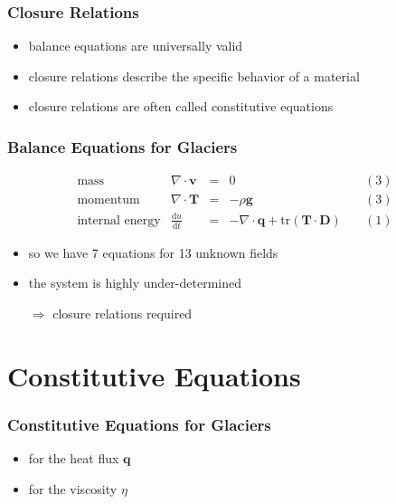 \documentclass[hide notes,intlimits]{beamer}
\begin{document}
\begin{frame}
  \frametitle{Closure Relations}
  \begin{itemize}
    \item \alert{balance equations} are universally valid
    \item \alert{closure relations} describe the specific behavior of a material
    \item \alert{closure relations} are often called \alert{constitutive equations}
  \end{itemize}
\end{frame}


\begin{frame}
  \frametitle{Balance Equations for Glaciers}
  \large{
  \begin{equation*}
  \begin{array}{lcclc}
    \text{mass} &  \nabla \cdot \mathbf{v} & = & 0 \quad & (3)\\
    \text{momentum} & \nabla \cdot \mathbf{T} & = & - \rho \mathbf{g} \quad & (3)\\
    \text{internal energy} & \frac{\text{d} u}{\text{d} t} & = & - \nabla \cdot \mathbf{q} + \text{tr}\left(\mathbf{T}\cdot\mathbf{D}\right) \quad & (1)
  \end{array}
  \end{equation*}
  }
  \begin{itemize}
   \item so we have 7 equations for 13 unknown fields
   \item the system is highly under-determined
   \item[$\Rightarrow$] \alert{closure relations} required
 \end{itemize}
\end{frame}


\section{Constitutive Equations}

\begin{frame}
  \frametitle{Constitutive Equations for Glaciers}
  \begin{itemize}
    \item for the heat flux $\mathbf{q}$
    \item for the viscosity $\eta$
  \end{itemize}
\end{frame}
\end{document}
